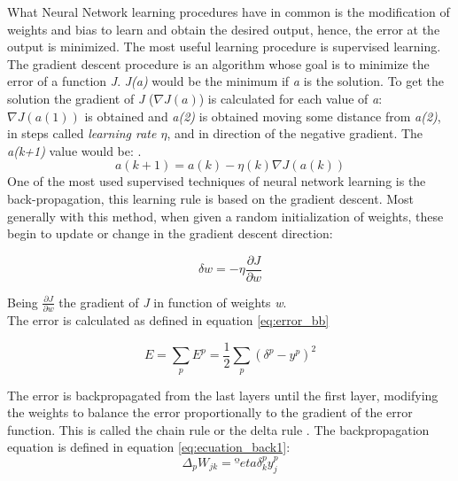 What Neural Network learning procedures have in common is the modification of weights and bias to learn and obtain the desired output, hence, the error at the output is minimized. The most useful learning procedure is supervised learning.\\

The gradient descent procedure is an algorithm whose goal is to minimize the error of a function \textit{J}. \textit{J(a)} would be the minimum if \textit{a} is the solution. To get the solution the gradient of \textit{J} ($\nabla J(a)$) is calculated for each value of \textit{a}: $\nabla J(a(1))$ is obtained and \textit{a(2)} is obtained moving some distance from \textit{a(2)}, in steps called \textit{learning rate $\eta$}, and in direction of the negative gradient. The \textit{a(k+1)} value would be: \cite{Duda}.\\

\begin{equation}
a(k+1) = a(k) - \eta (k) \nabla J(a(k))
\end{equation}
One of the most used supervised techniques of neural network learning is the back-propagation, this learning rule is based on the gradient descent. Most generally with this method, when given a random initialization of weights, these begin to update or change in the gradient descent direction:

\begin{equation}
\delta w = -\eta\frac{\partial J}{\partial w}
\end{equation}

Being $\frac{\partial J}{\partial w}$ the gradient of \textit{J} in function of weights \textit{w}.\\

The error is calculated as defined in equation \ref{eq:error_bb}

\begin{equation}
E=\sum_{p}E^p = \frac{1}{2}\sum_{p}(\delta^p- y^p)^2
\end{equation} \label{eq:error_bb}

The error is backpropagated from the last layers until the first layer, modifying the weights to balance the error proportionally to the gradient of the error function. This is called the chain rule or the delta rule \cite{Duda, BINN, krose}. The backpropagation equation is defined in equation \ref{eq:ecuation_back1}:\\

			\begin{equation}
			\Delta_{p}W_{jk}=ºeta \delta _{k}^{p}y_{j}^{p}
			\label{eq:ecuation_back1}
			\end{equation}\\

